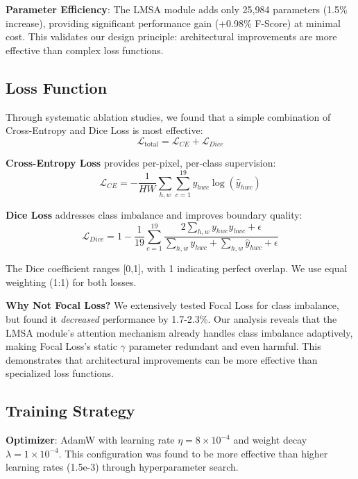 \textbf{Parameter Efficiency}: The LMSA module adds only 25,984 parameters (1.5\% increase), providing significant performance gain (+0.98\% F-Score) at minimal cost. This validates our design principle: architectural improvements are more effective than complex loss functions.

\subsection{Loss Function}

Through systematic ablation studies, we found that a simple combination of Cross-Entropy and Dice Loss is most effective:
\begin{equation}
\mathcal{L}_{\text{total}} = \mathcal{L}_{CE} + \mathcal{L}_{Dice}
\end{equation}

\textbf{Cross-Entropy Loss} provides per-pixel, per-class supervision:
\begin{equation}
\mathcal{L}_{CE} = -\frac{1}{HW}\sum_{h,w}\sum_{c=1}^{19} y_{hwc} \log(\hat{y}_{hwc})
\end{equation}

\textbf{Dice Loss} addresses class imbalance and improves boundary quality:
\begin{equation}
\mathcal{L}_{Dice} = 1 - \frac{1}{19}\sum_{c=1}^{19}\frac{2\sum_{h,w}y_{hwc}\hat{y}_{hwc} + \epsilon}{\sum_{h,w}y_{hwc} + \sum_{h,w}\hat{y}_{hwc} + \epsilon}
\end{equation}

The Dice coefficient ranges [0,1], with 1 indicating perfect overlap. We use equal weighting (1:1) for both losses.

\textbf{Why Not Focal Loss?} We extensively tested Focal Loss \cite{lin2017focal} for class imbalance, but found it \textit{decreased} performance by 1.7-2.3\%. Our analysis reveals that the LMSA module's attention mechanism already handles class imbalance adaptively, making Focal Loss's static $\gamma$ parameter redundant and even harmful. This demonstrates that architectural improvements can be more effective than specialized loss functions.

\subsection{Training Strategy}

\textbf{Optimizer}: AdamW with learning rate $\eta = 8 \times 10^{-4}$ and weight decay $\lambda = 1 \times 10^{-4}$. This configuration was found to be more effective than higher learning rates (1.5e-3) through hyperparameter search.

